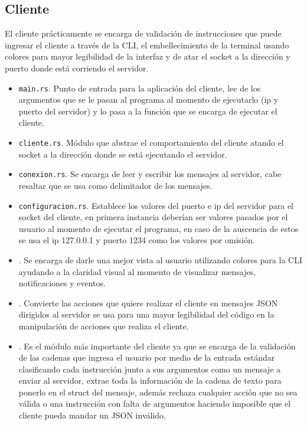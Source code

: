\documentclass[12pt]{article}
\begin{document}
\subsection{Cliente}

El cliente prácticamente se encarga de validación de instrucciones que puede ingresar el cliente a través de la CLI, el embellecimiento de la terminal usando colores para mayor legibilidad de la interfaz y de atar el socket a la dirección y puerto donde está corriendo el servidor.

\begin{itemize}

\item \texttt{main.rs}. Punto de entrada para la aplicación del cliente, lee de los argumentos que se le pasan al programa al momento de ejecutarlo (ip y puerto del servidor) y lo pasa a la función que se encarga de ejecutar el cliente.

\item \texttt{cliente.rs}. Módulo que abstrae el comportamiento del cliente atando el socket a la dirección donde se está ejecutando el servidor.

\item \texttt{conexion.rs}. Se encarga de leer y escribir los mensajes al servidor, cabe resaltar que se usa \texttt{\detokenize{\n}} como delimitador de los mensajes.

\item \texttt{configuracion.rs}. Establece los valores del puerto e ip del servidor para el socket del cliente, en primera instancia deberían ser valores pasados por el usuario al momento de ejecutar el programa, en caso de la auscencia de estos se usa el ip 127.0.0.1 y puerto 1234 como los valores por omisión.

\item \texttt{}. Se encarga de darle una mejor vista al usuario utilizando colores para la CLI ayudando a la claridad visual al momento de visualizar mensajes, notificaciones y eventos.

  \item \texttt{}. Convierte las acciones que quiere realizar el cliente en mensajes JSON dirigidos al servidor se usa para una mayor legibilidad del código en la manipulación de acciones que realiza el cliente.
  
\item \texttt{}. Es el módulo más importante del cliente ya que se encarga de la validación de las cadenas que ingresa el usuario por medio de la entrada estándar clasificando cada instrucción junto a sus argumentos como un mensaje a enviar al servidor, extrae toda la información de la cadena de texto para ponerlo en el struct del mensaje, además rechaza cualquier acción que no sea válida o una instrucción con falta de argumentos haciendo imposible que el cliente pueda mandar un JSON inválido.
  
\end{itemize}
\end{document}
